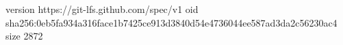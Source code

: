 version https://git-lfs.github.com/spec/v1
oid sha256:0eb5fa934a316face1b7425ce913d3840d54e4736044ee587ad3da2c56230ac4
size 2872

